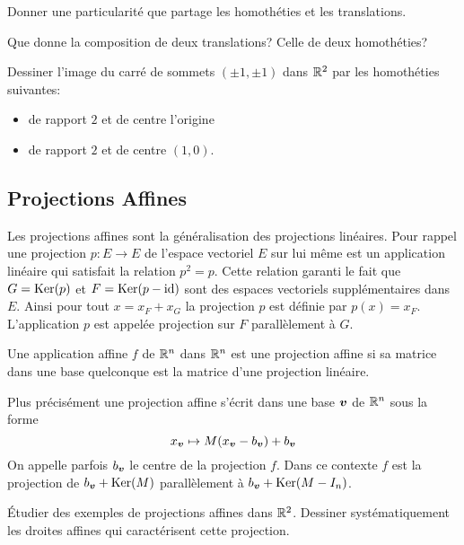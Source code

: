 \documentclass[11pt, a4paper]{article}
\begin{document}
\begin{question}
  Donner une particularité que partage les homothéties et les
  translations.
\end{question}
\begin{question}
  Que donne la composition de deux translations? Celle de deux
  homothéties?
\end{question}
\begin{question}
  Dessiner l'image du carré de sommets $(\pm 1, \pm 1)$
  dans $\mathbb{R}^2$ par les homothéties suivantes:
  \begin{itemize}
  \item[\textbullet]
    de rapport $2$ et de centre l'origine
  \item[\textbullet]
    de rapport $2$ et de centre $(1, 0)$.
  \end{itemize}
\end{question}

\subsection{Projections Affines}

Les projections affines sont la généralisation des projections
linéaires. Pour rappel une projection $p : E \rightarrow E$ de
l'espace vectoriel $E$ sur lui même est un application linéaire qui
satisfait la relation $p^2 = p$. Cette relation garanti le fait que
$G = \operatorname{Ker}(p)$ et $F = \operatorname{Ker}(p-\mathrm{id})$ sont des espaces vectoriels
supplémentaires dans $E$. Ainsi pour tout $x = x_F + x_G$ la
projection $p$ est définie par $p(x) = x_F$. L'application $p$ est
appelée projection sur $F$ parallèlement à $G$.
\begin{defn}
  Une application affine $f$ de $\mathbb{R}^n$ dans $\mathbb{R}^n$ est une projection
  affine si sa matrice dans une base quelconque est la matrice d'une
  projection linéaire.
\end{defn}
Plus précisément une projection affine s'écrit dans une base $\boldsymbol{v}$
de $\mathbb{R}^n$ sous la forme
\[
x_{\boldsymbol{v}} \mapsto M(x_{\boldsymbol{v}} - b_{\boldsymbol{v}}) + b_{\boldsymbol{v}}
\]
On appelle parfois $b_{\boldsymbol{v}}$ le centre de la projection $f$. Dans ce
contexte $f$ est la projection de $b_{\boldsymbol{v}} + \operatorname{Ker}(M)$ parallèlement
à $b_{\boldsymbol{v}} + \operatorname{Ker}(M-I_n)$.

\begin{question}
  Étudier des exemples de projections affines dans $\mathbb{R}^2$. Dessiner
  systématiquement les droites affines qui caractérisent cette
  projection.
\end{question}
\end{document}

